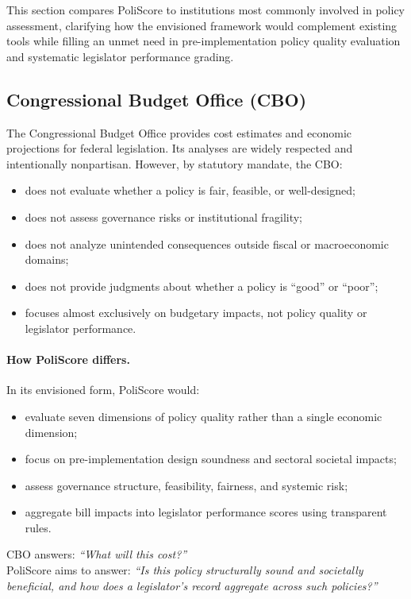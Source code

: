 \documentclass[12pt]{article}
\begin{document}
This section compares PoliScore to institutions most commonly involved in policy assessment, clarifying how the envisioned
framework would complement existing tools while filling an unmet need in pre-implementation policy quality evaluation and
systematic legislator performance grading.

\subsection{Congressional Budget Office (CBO)}

The Congressional Budget Office provides cost estimates and economic projections for federal legislation. Its analyses are
widely respected and intentionally nonpartisan. However, by statutory mandate, the CBO:

\begin{itemize}
    \item does not evaluate whether a policy is fair, feasible, or well-designed;
    \item does not assess governance risks or institutional fragility;
    \item does not analyze unintended consequences outside fiscal or macroeconomic domains;
    \item does not provide judgments about whether a policy is ``good'' or ``poor'';
    \item focuses almost exclusively on budgetary impacts, not policy quality or legislator performance.
\end{itemize}

\paragraph{How PoliScore differs.}

In its envisioned form, PoliScore would:

\begin{itemize}
    \item evaluate seven dimensions of policy quality rather than a single economic dimension;
    \item focus on pre-implementation design soundness and sectoral societal impacts;
    \item assess governance structure, feasibility, fairness, and systemic risk;
    \item aggregate bill impacts into legislator performance scores using transparent rules.
\end{itemize}

CBO answers: \textit{``What will this cost?''}\\
PoliScore aims to answer: \textit{``Is this policy structurally sound and societally beneficial, and how does a legislator's
record aggregate across such policies?''}
\end{document}
